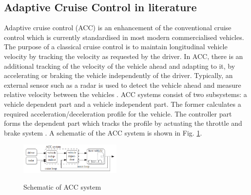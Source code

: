 \subsection{Adaptive Cruise Control in literature}

Adaptive cruise control (ACC) is an enhancement of the conventional cruise control which is currently standardised in most modern commercialised vehicles. The purpose of a classical cruise control is to maintain longitudinal vehicle velocity by tracking the velocity as requested by the driver. In ACC, there is an additional tracking of the velocity of the vehicle ahead and adapting to it, by accelerating or braking the vehicle independently of the driver. Typically, an external sensor such as a radar is used to detect the vehicle ahead and measure relative velocity between the vehicles \cite{Elsevier}.
ACC systems consist of two subsystems: a vehicle dependent part and a vehicle independent part. The former calculates a required acceleration/deceleration profile for the vehicle. The controller part forms the dependent part which tracks the profile by actuating the throttle and brake system \cite{Moon}. A schematic of the ACC system is shown in Fig. \ref{fig:Schematic_ACC}. 

\begin{figure}[h]
\centering
\includegraphics[width=0.45\textwidth]{img/ACC_schematic.png}\\
\caption{Schematic of ACC system \cite{Elsevier}}
\label{fig:Schematic_ACC}
\end{figure}

